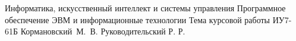 \documentclass{bmstu}
\begin{document}
    \makecourseworktitle
    {Информатика, искусственный интеллект и системы управления} %
    {Программное обеспечение ЭВМ и информационные технологии} %
    {Тема курсовой работы} %
    {ИУ7-61Б} %
    {Кормановский~М.~В.} %
    {Руководительский Р. Р.} %
    {}
    {}

    
    \maketableofcontents
    

    
    
    
    
    
    

    \clearpage
    \printbibliography[title=СПИСОК ИСПОЛЬЗОВАННЫХ ИСТОЧНИКОВ]

    \begin{appendices}
        
    \end{appendices}
\end{document}
